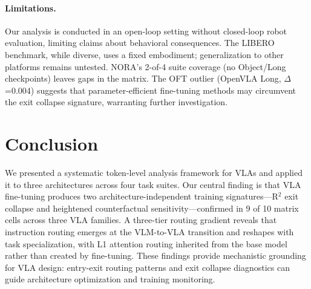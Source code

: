 \documentclass[letterpaper]{article}
\begin{document}
\paragraph{Limitations.}
Our analysis is conducted in an open-loop setting without closed-loop robot evaluation, limiting claims about behavioral consequences.
The LIBERO benchmark, while diverse, uses a fixed embodiment; generalization to other platforms remains untested.
NORA's 2-of-4 suite coverage (no Object/Long checkpoints) leaves gaps in the matrix.
The OFT outlier (OpenVLA Long, $\Delta$=0.004) suggests that parameter-efficient fine-tuning methods may circumvent the exit collapse signature, warranting further investigation.

\section{Conclusion}
\label{sec:conclusion}

We presented a systematic token-level analysis framework for VLAs and applied it to three architectures across four task suites.
Our central finding is that VLA fine-tuning produces two architecture-independent training signatures---R$^2$ exit collapse and heightened counterfactual sensitivity---confirmed in 9 of 10 matrix cells across three VLA families.
A three-tier routing gradient reveals that instruction routing emerges at the VLM-to-VLA transition and reshapes with task specialization, with L1 attention routing inherited from the base model rather than created by fine-tuning.
These findings provide mechanistic grounding for VLA design: entry-exit routing patterns and exit collapse diagnostics can guide architecture optimization and training monitoring.
\end{document}
